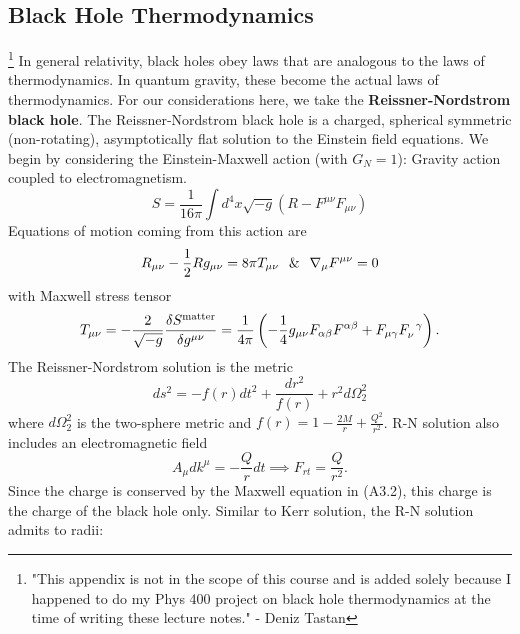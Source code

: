 \begin{appendices}
            
    \chapter{Black Hole Thermodynamics}\footnote{"This appendix is not in the scope of this course and is added solely because I happened to do my Phys 400 project on black hole thermodynamics at the time of writing these lecture notes." - Deniz Tastan}
        In general relativity, black holes obey laws that are analogous to the laws of thermodynamics. In quantum gravity, these become the actual laws of thermodynamics. For our considerations here, we take the \textbf{Reissner-Nordstrom black hole}. The Reissner-Nordstrom black hole is a charged, spherical symmetric (non-rotating), asymptotically flat solution to the Einstein field equations. We begin by considering the Einstein-Maxwell action (with $G_N = 1$): Gravity action coupled to electromagnetism.
        \begin{equation}
            S = \frac{1}{16\pi}\int d^4x\sqrt{-g}(R-F^{\mu\nu}F_{\mu\nu})
        \end{equation}
        Equations of motion coming from this action are
        \begin{equation}
            R_{\mu\nu}-\frac{1}{2}Rg_{\mu\nu}=8\pi T_{\mu\nu} \hspace{0.25cm}\&\hspace{0.25cm}\nabla_\mu F^{\mu\nu}=0
        \end{equation}
        with Maxwell stress tensor
        \begin{equation}
            T_{\mu\nu}=-\frac{2}{\sqrt{-g}}\frac{\delta S^\mathrm{matter}}{\delta g^{\mu\nu}} = \frac{1}{4\pi}\lrp{-\frac{1}{4}g_{\mu\nu}F_{\alpha\beta}F^{\alpha\beta}+F_{\mu\gamma}\tensor{F}{_\nu^\gamma}}.
        \end{equation}
        The Reissner-Nordstrom solution is the metric
        \begin{equation}
            ds^2 = -f(r)dt^2+\frac{dr^2}{f(r)}+r^2d\Omega_2^2
        \end{equation}
        where $d\Omega_2^2$ is the two-sphere metric and $f(r)=1-\frac{2M}{r}+\frac{Q^2}{r^2}$. R-N solution also includes an electromagnetic field
        \begin{equation}
            A_\mu dk^\mu = -\frac{Q}{r}dt \implies F_{rt}=\frac{Q}{r^2}.
        \end{equation}
        Since the charge is conserved by the Maxwell equation in (A3.2), this charge is the charge of the black hole only. Similar to Kerr solution, the R-N solution admits to radii:

\end{appendices}
